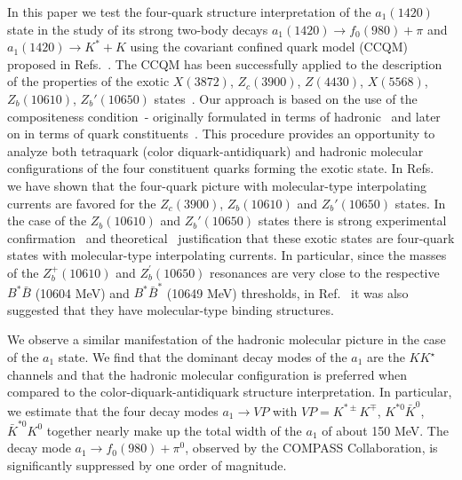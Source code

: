 \documentclass[aps,prd,floatfix,superscriptaddress,showpacs,showkeys]{revtex4}
\begin{document}
In this paper we test the four-quark structure interpretation of  
the $a_1(1420)$ state in the study of its strong two-body decays  
$a_1(1420) \to f_0(980) + \pi$ and $a_1(1420) \to K^{*} + K$
using the covariant confined quark model (CCQM) proposed in 
Refs.~\cite{Branz:2009cd,Dubnicka:2010kz,Dubnicka:2011mm}. 
The CCQM has been successfully 
applied to the description of the properties of the exotic 
$X(3872)$, $Z_c(3900)$, $Z(4430)$, $X(5568)$, 
$Z_b(10610)$, $Z_b'(10650)$  
states~\cite{Dubnicka:2010kz,Dubnicka:2011mm,%
Gutsche:2016cml,Goerke:2016hxf,Goerke:2017svb}. 
Our approach is based on the use 
of the compositeness condition~\cite{Weinberg:1962hj}-\cite{Efimov:1993ei} 
originally formulated in terms of hadronic~\cite{Weinberg:1962hj,Hayashi:1967hj} 
and later on in terms of quark constituents~\cite{Efimov:1993ei}.  
This procedure provides an opportunity 
to analyze both tetraquark (color diquark-antidiquark) 
and hadronic molecular configurations of the four constituent quarks 
forming the exotic state. In Refs.~\cite{Goerke:2016hxf,Goerke:2017svb} 
we have shown that the four-quark picture with molecular-type interpolating 
currents are favored for the $Z_c(3900)$, $Z_b(10610)$ and 
$Z_b'(10650)$ states. In the case of the $Z_b(10610)$ and 
$Z_b'(10650)$ states there is strong experimental confirmation~\cite{Garmash:2015rfd} 
and theoretical~\cite{Bondar:2011ev} justification that these exotic states 
are four-quark states with molecular-type interpolating currents. 
In particular, since the masses of the $Z^+_b(10610)$ and $Z_b^\prime(10650)$ 
resonances are very close to the respective $B^*\bar B$ (10604 MeV)
and  $B^*\bar B^*$ (10649 MeV) thresholds, 
in Ref.~\cite{Bondar:2011ev} it was also suggested  
that they have molecular-type binding structures.
 
We observe a similar manifestation of the hadronic molecular picture in
the case of the $a_1$ state. 
We find that the dominant decay modes of the $a_1$ are the 
$K K^\star$ channels and 
that the hadronic molecular configuration is preferred 
when compared to the color-diquark-antidiquark structure interpretation. 
In particular, we estimate 
that the four decay modes $a_1 \to VP$ with $VP = K^{*\pm}K^{\mp}$, 
$K^{*0}\bar K^0$, $\bar K^{*0}K^0$ together nearly make up the   
total width of the $a_1$ of about 150 MeV. 
The decay mode $a_1 \to f_0(980) + \pi^0$, observed by the COMPASS 
Collaboration, is significantly suppressed by one order of magnitude. 
\end{document}

